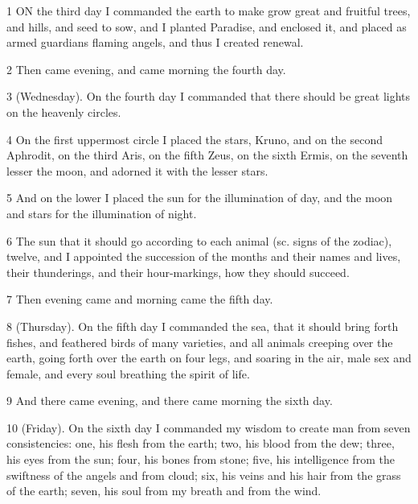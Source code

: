 \par 1 ON the third day I commanded the earth to make grow great and fruitful trees, and hills, and seed to sow, and I planted Paradise, and enclosed it, and placed as armed guardians flaming angels, and thus I created renewal.

\par 2 Then came evening, and came morning the fourth day.

\par 3 (Wednesday). On the fourth day I commanded that there should be great lights on the heavenly circles.

\par 4 On the first uppermost circle I placed the stars, Kruno, and on the second Aphrodit, on the third Aris, on the fifth Zeus, on the sixth Ermis, on the seventh lesser the moon, and adorned it with the lesser stars.

\par 5 And on the lower I placed the sun for the illumination of day, and the moon and stars for the illumination of night.

\par 6 The sun that it should go according to each animal (sc. signs of the zodiac), twelve, and I appointed the succession of the months and their names and lives, their thunderings, and their hour-markings, how they should succeed.

\par 7 Then evening came and morning came the fifth day.

\par 8 (Thursday). On the fifth day I commanded the sea, that it should bring forth fishes, and feathered birds of many varieties, and all animals creeping over the earth, going forth over the earth on four legs, and soaring in the air, male sex and female, and every soul breathing the spirit of life.

\par 9 And there came evening, and there came morning the sixth day.

\par 10 (Friday). On the sixth day I commanded my wisdom to create man from seven consistencies: one, his flesh from the earth; two, his blood from the dew; three, his eyes from the sun; four, his bones from stone; five, his intelligence from the swiftness of the angels and from cloud; six, his veins and his hair from the grass of the earth; seven, his soul from my breath and from the wind.

